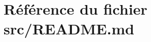 \hypertarget{README_8md}{}\section{Référence du fichier src/\+R\+E\+A\+D\+ME.md}
\label{README_8md}
